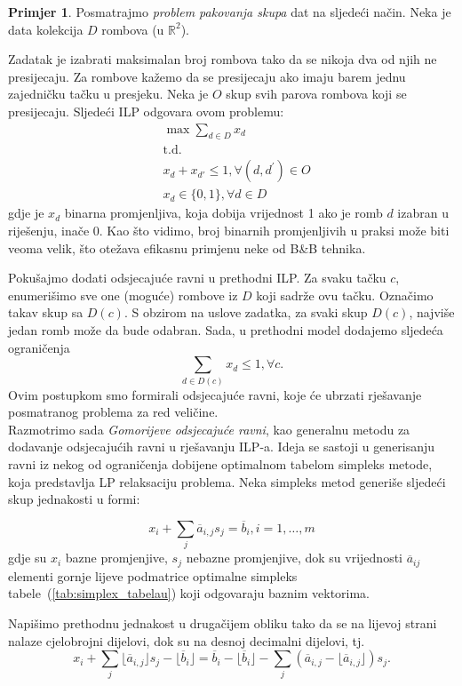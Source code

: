\documentclass[a4paper, utf8, 11pt, colorlinks]{book}
\theoremstyle{definition}
\newtheorem{primjer}{Primjer}[chapter]
\begin{document}
\begin{primjer}
Posmatrajmo   \emph{problem pakovanja skupa} dat na sljedeći način. Neka je data kolekcija $D$ rombova (u $\mathbb{R}^2$). 
\end{primjer}
Zadatak je izabrati maksimalan broj rombova tako da se nikoja dva od njih ne presijecaju.  Za rombove kažemo da se presijecaju ako imaju barem jednu zajedničku tačku u presjeku. 
Neka je $O$ skup svih parova rombova koji se presijecaju. Sljedeći ILP odgovara ovom problemu:
\begin{align*}
    &\max \sum_{d\in D}x_d\\
    &\mbox{t.d.} \\
    & x_d + x_{d'} \leq 1, \forall (d, d^{'}) \in O \\
    & x_d \in \{0,1\}, \forall d \in D
\end{align*}
gdje je $x_d$ binarna promjenljiva, koja dobija vrijednost 1 ako je romb $d$ izabran u riješenju, inače 0. 
Kao što vidimo, broj binarnih promjenljivih u praksi može biti veoma velik, što otežava efikasnu primjenu neke od B\&B tehnika.

Pokušajmo dodati odsjecajuće ravni u prethodni ILP. Za svaku tačku $c$, enumerišimo sve one (moguće) rombove iz $D$ koji sadrže ovu tačku. Označimo takav skup sa $D(c)$. S obzirom na uslove zadatka, za svaki skup $D(c)$, najviše jedan romb može da bude odabran. Sada,  u prethodni model dodajemo sljedeća ograničenja
\begin{equation}
     \sum_{d \in D(c)} x_d \leq 1, \forall c.
\end{equation}
Ovim postupkom smo formirali odsjecajuće ravni, koje će ubrzati rješavanje posmatranog problema za   red veličine. \\

Razmotrimo sada \emph{Gomorijeve odsjecajuće ravni}, kao generalnu metodu za dodavanje odsjecajućih ravni u rješavanju  ILP-a.  Ideja se sastoji u generisanju ravni iz nekog od ograničenja dobijene optimalnom tabelom simpleks metode, koja predstavlja LP relaksaciju problema. Neka simpleks metod generiše sljedeći skup jednakosti u formi:
 

$$x_i + \sum_{ j} \overline{a}_{i,j} s_j= \overline{b}_i, i=1, \ldots,m$$
gdje su $x_i$ bazne promjenjive, $s_j$ nebazne promjenjive, dok su vrijednosti $\overline{a}_{ij}$ elementi gornje lijeve podmatrice optimalne simpleks tabele~(\ref{tab:simplex_tabelau}) koji odgovaraju baznim vektorima.  
 
 Napišimo prethodnu jednakost u drugačijem obliku tako da se na lijevoj strani nalaze cjelobrojni dijelovi, dok su na desnoj decimalni dijelovi, tj.
$$x_i + \sum_{j} \lfloor \overline{a}_{i,j} \rfloor s_j - \lfloor \overline{b}_i \rfloor = \overline{b}_i - \lfloor \overline{b}_i  \rfloor    - \sum_{j} (\overline{a}_{i,j} - \lfloor \overline{a}_{i,j} \rfloor) s_j.$$
\end{document}
